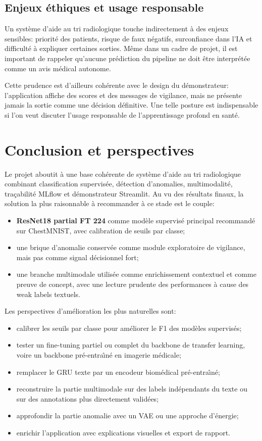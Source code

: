\documentclass[11pt,a4paper]{article}
\newif\ifsectionbreakenabled
\let\oldsection\section
\renewcommand{\section}[1]{%
    \ifsectionbreakenabled
        \clearpage
    \else
        \sectionbreakenabledtrue
    \fi
    \oldsection{#1}%
}
\begin{document}
\subsection{Enjeux \'ethiques et usage responsable}
Un syst\`eme d'aide au tri radiologique touche indirectement \`a des enjeux sensibles: priorit\'e des patients, risque de faux n\'egatifs, surconfiance dans l'IA et difficult\'e \`a expliquer certaines sorties. M\^eme dans un cadre de projet, il est important de rappeler qu'aucune pr\'ediction du pipeline ne doit \^etre interpr\'et\'ee comme un avis m\'edical autonome.

Cette prudence est d'ailleurs coh\'erente avec le design du d\'emonstrateur: l'application affiche des scores et des messages de vigilance, mais ne pr\'esente jamais la sortie comme une d\'ecision d\'efinitive. Une telle posture est indispensable si l'on veut discuter l'usage responsable de l'apprentissage profond en sant\'e.

\section{Conclusion et perspectives}
Le projet aboutit \`a une base coh\'erente de syst\`eme d'aide au tri radiologique combinant classification supervis\'ee, d\'etection d'anomalies, multimodalit\'e, tra\c{c}abilit\'e MLflow et d\'emonstrateur Streamlit. Au vu des r\'esultats finaux, la solution la plus raisonnable \`a recommander \`a ce stade est le couple:
\begin{itemize}
    \item \textbf{ResNet18 partial FT 224} comme mod\`ele supervis\'e principal recommand\'e sur ChestMNIST, avec calibration de seuils par classe;
    \item une brique d'anomalie conserv\'ee comme module exploratoire de vigilance, mais pas comme signal d\'ecisionnel fort;
    \item une branche multimodale utilis\'ee comme enrichissement contextuel et comme preuve de concept, avec une lecture prudente des performances \`a cause des weak labels textuels.
\end{itemize}

Les perspectives d'am\'elioration les plus naturelles sont:
\begin{itemize}
    \item calibrer les seuils par classe pour am\'eliorer le F1 des mod\`eles supervis\'es;
    \item tester un fine-tuning partiel ou complet du backbone de transfer learning, voire un backbone pr\'e-entra\^\i n\'e en imagerie m\'edicale;
    \item remplacer le GRU texte par un encodeur biom\'edical pr\'e-entra\^\i n\'e;
    \item reconstruire la partie multimodale sur des labels ind\'ependants du texte ou sur des annotations plus directement valid\'ees;
    \item approfondir la partie anomalie avec un VAE ou une approche d'\'energie;
    \item enrichir l'application avec explications visuelles et export de rapport.
\end{itemize}
\end{document}
